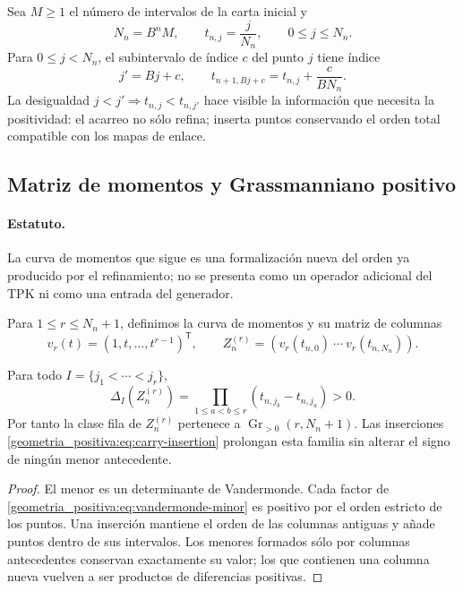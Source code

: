 Sea \(M\ge1\) el número de intervalos de la carta inicial y
\begin{equation}
 N_n=B^nM,\qquad t_{n,j}=\frac{j}{N_n},\qquad 0\le j\le N_n.
 \label{geometria_positiva:eq:ordered-carry-points}
\end{equation}
Para \(0\le j<N_n\), el subintervalo de índice \(c\) del punto \(j\) tiene índice
\begin{equation}
 j'=Bj+c,\qquad
 t_{n+1,Bj+c}=t_{n,j}+\frac{c}{BN_n}.
 \label{geometria_positiva:eq:carry-insertion}
\end{equation}
La desigualdad \(j<j'\Rightarrow t_{n,j}<t_{n,j'}\) hace visible la
información que necesita la positividad: el acarreo no sólo refina; inserta
puntos conservando el orden total compatible con los mapas de enlace.

\subsection{Matriz de momentos y Grassmanniano positivo}

\paragraph{Estatuto.}
La curva de momentos que sigue es una formalización nueva del orden ya
producido por el refinamiento; no se presenta como un operador adicional del
TPK ni como una entrada del generador.

Para \(1\le r\le N_n+1\), definimos la curva de momentos y su matriz de
columnas
\[
 v_r(t)=(1,t,\ldots,t^{r-1})^{\mathsf T},\qquad
 Z_n^{(r)}=(v_r(t_{n,0})\ \cdots\ v_r(t_{n,N_n})).
\]

\begin{theorem}
\label{geometria_positiva:thm:tpk-vandermonde-positive}
Para todo \(I=\{j_1<\cdots<j_r\}\),
\begin{equation}
 \Delta_I(Z_n^{(r)})
 =\prod_{1\le a<b\le r}(t_{n,j_b}-t_{n,j_a})>0.
 \label{geometria_positiva:eq:vandermonde-minor}
\end{equation}
Por tanto la clase fila de \(Z_n^{(r)}\) pertenece a
\(\operatorname{Gr}_{>0}(r,N_n+1)\). Las inserciones
\eqref{geometria_positiva:eq:carry-insertion} prolongan esta familia sin alterar el signo de
ningún menor antecedente.
\end{theorem}
\begin{proof}
El menor es un determinante de Vandermonde. Cada factor de
\eqref{geometria_positiva:eq:vandermonde-minor} es positivo por el orden estricto de los puntos.
Una inserción mantiene el orden de las columnas antiguas y añade puntos dentro
de sus intervalos. Los menores formados sólo por columnas antecedentes
conservan exactamente su valor; los que contienen una columna nueva vuelven a
ser productos de diferencias positivas.
\end{proof}


